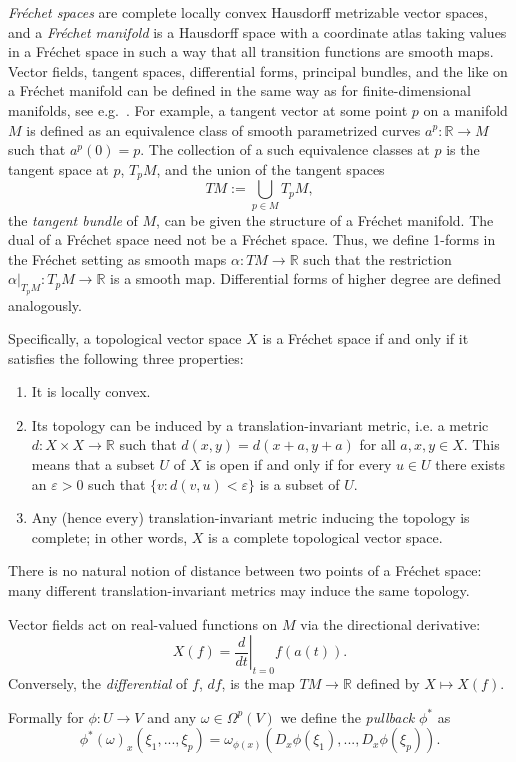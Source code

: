 \documentclass{article}
\theoremstyle{plain}
\theoremstyle{definition}
\numberwithin{equation}{section}
\newcommand{\R}{\ensuremath{\mathbb{R}}}
\begin{document}
\textit{Fréchet spaces} are complete locally convex Hausdorff metrizable vector spaces, and a \textit{Fréchet manifold} is a Hausdorff space with a coordinate atlas taking values in a Fréchet space in such a way that all transition functions are smooth maps. Vector fields, tangent spaces, differential forms, principal bundles, and the like on a Fréchet manifold can be defined in the same way as for finite-dimensional manifolds, see e.g.~\cite{filipovic2003existence}. For example, a tangent vector at some point $p$ on a manifold $M$ is defined as an equivalence class of smooth parametrized curves $a^p:\R\to M$ such that $a^p(0)=p$. The collection of a such equivalence classes at $p$ is the tangent space at $p$, $T_pM$, and the union of the tangent spaces
\[
TM:=\bigcup_{p\in M}T_pM,
\]
the \textit{tangent bundle} of $M$, can be given the structure of a Fréchet manifold. The dual of a Fréchet space need not be a Fréchet space. Thus, we define 1-forms in the Fréchet setting as smooth maps $\alpha: TM\to\R$ such that the restriction $\alpha|_{T_pM}:T_pM\to\R$ is a smooth map. Differential forms of higher degree are defined analogously.

Specifically, a topological vector space $X$ is a Fréchet space if and only if it satisfies the following three properties:
%
\begin{enumerate} 
\item It is locally convex.
\item Its topology can be induced by a translation-invariant metric, i.e. a metric $d: X\times X \to\R$ such that $d(x, y) = d(x+a, y+a)$ for all $a,x,y \in X$. This means that a subset $U$ of $X$ is open if and only if for every $u\in U$ there exists an $\varepsilon > 0$ such that $\{v : d(v, u) < \varepsilon\}$ is a subset of $U$.
\item Any (hence every) translation-invariant metric inducing the topology is complete; in other words, $X$ is a complete topological vector space.
\end{enumerate}

There is no natural notion of distance between two points of a Fréchet space: many different translation-invariant metrics may induce the same topology. 

Vector fields act on real-valued functions on $M$ via the directional derivative:
\[
  X(f)=\left.\frac{d}{dt}\right|_{t=0} f(a(t)).
\]
Conversely, the \textit{differential} of $f$, $df$, is the map $TM\to \R$ defined by $X\mapsto X(f)$.

Formally for $\phi: U\to V$ and any $\omega\in \Omega^p(V)$ we define the \textit{pullback} $\phi^*$ as
\[
 \phi^*(\omega)_x(\xi_1,...,\xi_p)=\omega_{\phi(x)}\left(D_x\phi(\xi_1),...,D_x\phi(\xi_p)\right).
\]
\end{document}
